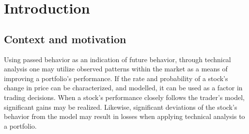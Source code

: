 \chapter{Introduction}
 
\section{Context and motivation}\label{intro}
Using passed behavior as an indication of future behavior, through technical analysis one may utilize observed patterns within the market as a means of improving a portfolio's performance.  If the rate and probability of a stock's change in price can be characterized, and modelled, it can be used as a factor in trading decisions.  When a stock's performance closely follows the trader's model, significant gains may be realized.  Likewise, significant deviations of the stock's behavior from the model may result in losses when applying technical analysis to a portfolio.

